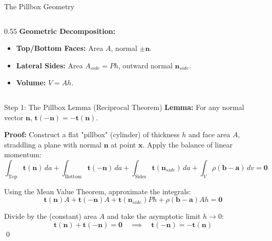 \documentclass[aspectratio=169]{beamer}
\begin{document}
\begin{frame}{The Pillbox Geometry}
\begin{columns}
\begin{column}{0.55\textwidth}
            \vspace{0.2cm}
            \textbf{Geometric Decomposition:}
            \begin{itemize}
                \item \textbf{Top/Bottom Faces:} Area $A$, normal $\pm\bm{n}$.
                \item \textbf{Lateral Sides:} Area $A_{side} = P h$, outward normal $\bm{n}_{side}$.
                \item \textbf{Volume:} $V = A h$.
            \end{itemize}
        \end{column}
    \end{columns}
\end{frame}

\begin{frame}{Step 1: The Pillbox Lemma (Reciprocal Theorem)}
    \textbf{Lemma:} For any normal vector $\bm{n}$, $\bm{t}(-\bm{n}) = -\bm{t}(\bm{n})$.

    \textbf{Proof:} Construct a flat "pillbox" (cylinder) of thickness $h$ and face area $A$, straddling a plane with normal $\bm{n}$ at point $\bm{x}$. Apply the balance of linear momentum:
    $$ \int_{\text{Top}} \bm{t}(\bm{n}) \, da + \int_{\text{Bottom}} \bm{t}(-\bm{n}) \, da + \int_{\text{Sides}} \bm{t}(\bm{n}_{side}) \, da + \int_V \rho (\bm{b} - \bm{a}) \, dv = \bm{0} $$

    Using the Mean Value Theorem, approximate the integrals:
    $$ \bm{t}(\bm{n}) A + \bm{t}(-\bm{n}) A + \bm{t}(\bm{n}_{side}) P h + \rho (\bm{b} - \bm{a}) A h = \bm{0} $$

    Divide by the (constant) area $A$ and take the asymptotic limit $h \to 0$:
    $$ \bm{t}(\bm{n}) + \bm{t}(-\bm{n}) = \bm{0} \quad \implies \quad \bm{t}(-\bm{n}) = -\bm{t}(\bm{n}) $$ \qed
\end{frame}
\end{document}
